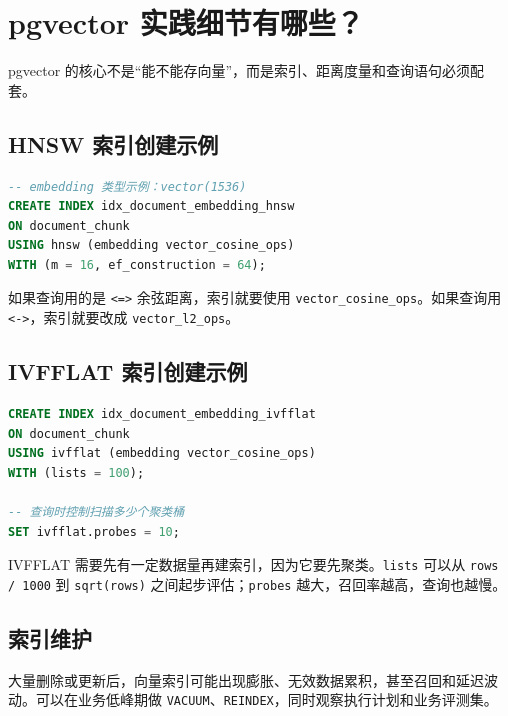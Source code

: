 \documentclass[10pt,a4paper]{ctexart}
\begin{document}
\section{pgvector 实践细节有哪些？}


pgvector 的核心不是“能不能存向量”，而是索引、距离度量和查询语句必须配套。



\subsection{HNSW 索引创建示例}


\begin{lstlisting}[language=SQL]
-- embedding 类型示例：vector(1536)
CREATE INDEX idx_document_embedding_hnsw
ON document_chunk
USING hnsw (embedding vector_cosine_ops)
WITH (m = 16, ef_construction = 64);
\end{lstlisting}



如果查询用的是 \texttt{<=>} 余弦距离，索引就要使用 \texttt{vector\_cosine\_ops}。如果查询用 \texttt{<->}，索引就要改成 \texttt{vector\_l2\_ops}。



\subsection{IVFFLAT 索引创建示例}


\begin{lstlisting}[language=SQL]
CREATE INDEX idx_document_embedding_ivfflat
ON document_chunk
USING ivfflat (embedding vector_cosine_ops)
WITH (lists = 100);

-- 查询时控制扫描多少个聚类桶
SET ivfflat.probes = 10;
\end{lstlisting}



IVFFLAT 需要先有一定数据量再建索引，因为它要先聚类。\texttt{lists} 可以从 \texttt{rows / 1000} 到 \texttt{sqrt(rows)} 之间起步评估；\texttt{probes} 越大，召回率越高，查询也越慢。



\subsection{索引维护}


大量删除或更新后，向量索引可能出现膨胀、无效数据累积，甚至召回和延迟波动。可以在业务低峰期做 \texttt{VACUUM}、\texttt{REINDEX}，同时观察执行计划和业务评测集。
\end{document}
